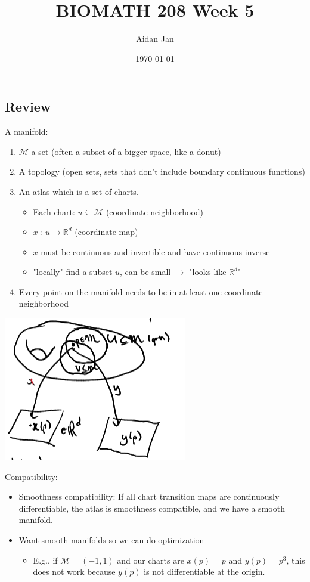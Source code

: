 \documentclass[10pt]{article}
\title{BIOMATH 208 Week 5}
\author{Aidan Jan}
\date{\today}
\newcommand{\R}{\mathbb{R}}
\begin{document}
\maketitle
\subsection*{Review}
A manifold:
\begin{enumerate}
    \item $\mathcal{M}$ a set (often a subset of a bigger space, like a donut)
    \item A topology (open sets, sets that don't include boundary continuous functions)
    \item An atlas which is a set of charts.
    \begin{itemize}
        \item Each chart: $u \subseteq \mathcal{M}$ (coordinate neighborhood)
        \item $x \::\: u \rightarrow \R^d$ (coordinate map)
        \item $x$ must be continuous and invertible and have continuous inverse
        \item "locally" find a subset $u$, can be small $\rightarrow$ "looks like $\R^d$"
    \end{itemize}
    \item Every point on the manifold needs to be in at least one coordinate neighborhood
\end{enumerate}
\begin{center}
    \includegraphics*[scale=0.9]{W5_5.png}
\end{center}
Compatibility:
\begin{itemize}
    \item Smoothness compatibility: If all chart transition maps are continuously differentiable, the atlas is smoothness compatible, and we have a smooth manifold.
    \item Want smooth manifolds so we can do optimization
    \begin{itemize}
        \item E.g., if $\mathcal{M} = (-1, 1)$ and our charts are $x(p) = p$ and $y(p) = p^3$, this does not work because $y(p)$ is not differentiable at the origin.
    \end{itemize}
\end{itemize}
\end{document}
